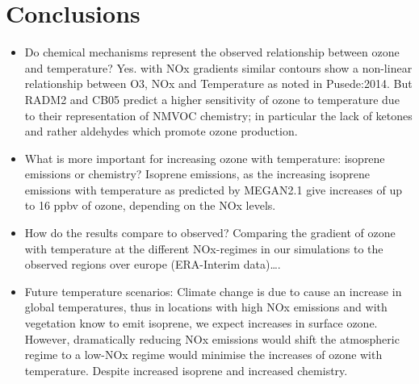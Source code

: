 \documentclass[11pt,a4paper]{article}
\begin{document}
\section{Conclusions} \label{s:conclusions}
\begin{itemize}
    \item Do chemical mechanisms represent the observed relationship between ozone and temperature? Yes. with NOx gradients similar contours show a non-linear relationship between O3, NOx and Temperature as noted in Pusede:2014. But RADM2 and CB05 predict a higher sensitivity of ozone to temperature due to their representation of NMVOC chemistry; in particular the lack of ketones and rather aldehydes which promote ozone production.
    \item What is more important for increasing ozone with temperature: isoprene emissions or chemistry? Isoprene emissions, as the increasing isoprene emissions with temperature as predicted by MEGAN2.1 give increases of up to 16 ppbv of ozone, depending on the NOx levels.
    \item How do the results compare to observed? Comparing the gradient of ozone with temperature at the different NOx-regimes in our simulations to the observed regions over europe (ERA-Interim data)\dots.
    \item Future temperature scenarios: Climate change is due to cause an increase in global temperatures, thus in locations with high NOx emissions and with vegetation know to emit isoprene, we expect increases in surface ozone. However, dramatically reducing NOx emissions would shift the atmospheric regime to a low-NOx regime would minimise the increases of ozone with temperature. Despite increased isoprene and increased chemistry.
\end{itemize}


 
\end{document}
